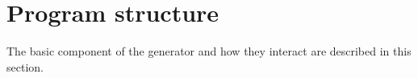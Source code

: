 \section{Program structure}
\label{sect:programstructure}

The basic component of the generator and how they interact
are described in this section. 

